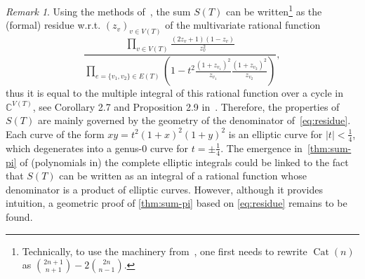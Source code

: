 \documentclass[12pt]{amsart}
\theoremstyle{plain}
\theoremstyle{remark}
\newtheorem{remark}[lemma]{Remark}
\DeclareMathOperator{\Cat}{Cat}
\begin{document}
\begin{remark}\label{rem:residue}
	Using the methods of~\cite{BoLaSa17}, the sum $S(T)$ can be written\footnote{Technically, to use the machinery from~\cite{BoLaSa17}, one first needs to rewrite $\Cat(n)$ as $\binom{2n+1}{n+1} - 2 \binom{2n}{n-1}$.\label{footnote:BLS}} as the (formal) residue w.r.t. $(z_v)_{v \in V(T)}$ of the multivariate rational function
\begin{equation} \label{eq:residue}
\frac{\displaystyle{\prod_{v \in V(T)}} \frac{(2 z_{v}+1) (1-z_v)}{z_v^2}}{\displaystyle{\prod_{e=\{v_1,v_2\} \in E(T)}} \left( 1-t^2 \frac{(1+z_{v_1})^2}{z_{v_1}} \frac{(1+z_{v_2})^2}{z_{v_2}}\right)} ,
\end{equation}	
thus it is equal to the multiple integral of this rational function over a cycle in~$\mathbb{C}^{V(T)}$, see Corollary 2.7 and Proposition 2.9 in~\cite{BoLaSa17}.
Therefore, the properties of $S(T)$ are mainly governed by the geometry of the denominator of~\eqref{eq:residue}. Each curve of the form $xy = t^2 {(1+x)^2} {(1+y)^2}$ is an elliptic curve for $|t|<\frac14$, which degenerates into a genus-0 curve for $t=\pm\frac14$.
The emergence in~\cref{thm:sum-pi} of (polynomials in) the complete elliptic integrals could be linked to the fact that $S(T)$ can be written as an integral of a rational function whose denominator is a product of elliptic curves. 
%
However, although it provides intuition, a geometric proof of \cref{thm:sum-pi} based on \eqref{eq:residue} remains to be found. 
\end{remark}	
	
\end{document}
